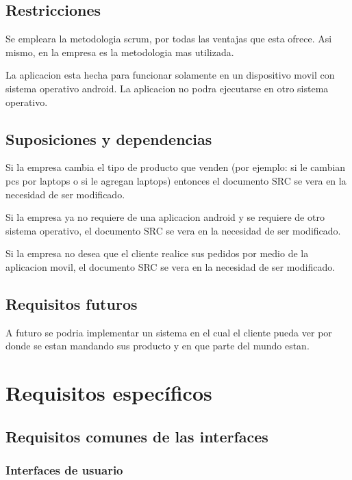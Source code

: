 \documentclass[12pt,a4paper, twosite]{article}
\begin{document}
\subsection{Restricciones}
\label{sec:org5ca5790}

Se empleara la metodologia scrum, por todas las ventajas que esta ofrece. Asi mismo, en la empresa es la metodologia mas utilizada.

La aplicacion esta hecha para funcionar solamente en un dispositivo movil con sistema operativo android. La aplicacion no podra ejecutarse en otro sistema operativo.


\subsection{Suposiciones y dependencias}
\label{sec:org0ae23fe}

Si la empresa cambia el tipo de producto que venden (por ejemplo: si le cambian pcs por laptops o si le agregan laptops) entonces el documento SRC se vera en la necesidad de ser modificado.

Si la empresa ya no requiere de una aplicacion android y se requiere de otro sistema operativo, el documento SRC se vera en la necesidad de ser modificado.

Si la empresa no desea que el cliente realice sus pedidos por medio de la aplicacion movil, el documento SRC se vera en la necesidad de ser modificado.


\subsection{Requisitos futuros}
\label{sec:org33cfcdb}

A futuro se podria implementar un sistema en el cual el cliente pueda ver por donde se estan mandando sus producto y en que parte del mundo estan.


\section{Requisitos específicos}
\label{sec:org40573d1}





\subsection{Requisitos comunes de las interfaces}
\label{sec:orgfd5391f}

\subsubsection{Interfaces de usuario}
\end{document}
